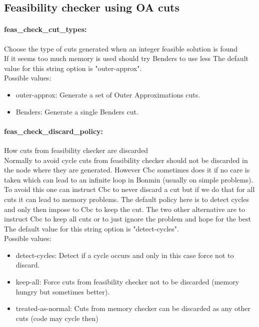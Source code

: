 \subsection{Feasibility checker using OA cuts}
\label{sec:FeasibilitycheckerusingOAcuts}
\paragraph{feas\_check\_cut\_types:}\label{opt:feas_check_cut_types} Choose the type of cuts generated when an integer feasible solution is found \\
 If it seems too much memory is used should try Benders to use less The default value for this string option is "outer-approx".
\\ 
Possible values:
\begin{itemize}
   \item outer-approx: Generate a set of Outer Approximations cuts.
   \item Benders: Generate a single Benders cut.
\end{itemize}

\paragraph{feas\_check\_discard\_policy:}\label{opt:feas_check_discard_policy} How cuts from feasibility checker are discarded \\
 Normally to avoid cycle cuts from feasibility checker should not be discarded in the node where they are generated. However Cbc sometimes does it if no care is taken which can lead to an infinite loop in Bonmin (usually on simple problems). To avoid this one can instruct Cbc to never discard a cut but if we do that for all cuts it can lead to memory problems. The default policy here is to detect cycles and only then impose to Cbc to keep the cut. The two other alternative are to instruct Cbc to keep all cuts or to just ignore the problem and hope for the best The default value for this string option is "detect-cycles".
\\ 
Possible values:
\begin{itemize}
   \item detect-cycles: Detect if a cycle occurs and only in this case force not to discard.
   \item keep-all: Force cuts from feasibility checker not to be discarded (memory hungry but sometimes better).
   \item treated-as-normal: Cuts from memory checker can be discarded as any other cuts (code may cycle then)
\end{itemize}

